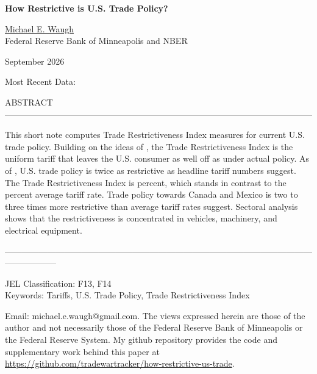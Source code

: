 \documentclass[12pt,pdftex]{article}
\begin{document}
\begin{onehalfspacing}

{\large \textbf{How Restrictive is U.S. Trade Policy?}}

\vspace{0.5cm}

\href{http://www.waugheconomics.com/}{Michael E. Waugh} \\ Federal Reserve Bank of Minneapolis and NBER

\vspace{0.5cm}

September 2026

\vspace{0.5cm}

Most Recent Data: \textbf{\currentdate{}}

\vspace{1.5cm}


\normalsize

ABSTRACT ------------------------------------------------------------------------------------------------------------

This short note computes Trade Restrictiveness Index measures for current U.S. trade policy. Building on the ideas of \citet{anderson1996new, anderson2005measuring}, the Trade Restrictiveness Index is the uniform tariff that leaves the U.S. consumer as well off as under actual policy. As of \currentdate{}, U.S. trade policy is twice as restrictive as headline tariff numbers suggest. The Trade Restrictiveness Index is \rmsValuetwofive{}  percent, which stands in contrast to the \simpleMeanValuetwofive{} percent average tariff rate. Trade policy towards Canada and Mexico is two to three times more restrictive than average tariff rates suggest. Sectoral analysis shows that the restrictiveness is concentrated in vehicles, machinery, and electrical equipment.

------------------------------------------------------------------------------------------------------------------------------
\vspace{0.25cm}

JEL Classification: F13, F14\\
Keywords: Tariffs, U.S. Trade Policy, Trade Restrictiveness Index


\vspace{4.0cm}

{\footnotesize Email: michael.e.waugh@gmail.com. The views expressed herein are those of the author and not necessarily those of the Federal Reserve Bank of Minneapolis or the Federal Reserve System. My github repository provides the code and supplementary work behind this paper at \url{https://github.com/tradewartracker/how-restrictive-us-trade}.}


\end{onehalfspacing}
\end{document}
